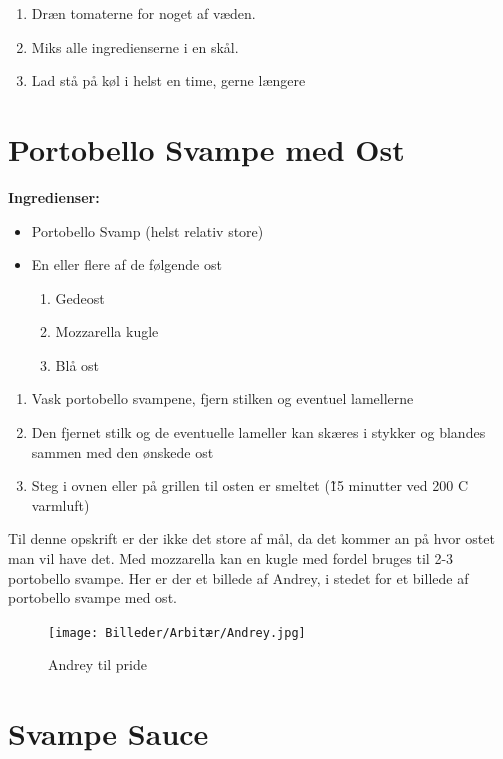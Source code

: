 \documentclass{book}
\begin{document}
\begin{minipage}[t]{0.5\textwidth}
\begin{enumerate}
    \item Dræn tomaterne for noget af væden.
    \item Miks alle ingredienserne i en skål.
    \item Lad stå på køl i helst en time, gerne længere
\end{enumerate}
\end{minipage}
\newpage 
{}
\newpage\section{Portobello Svampe med Ost}
\begin{minipage}[t]{0.5\textwidth}
\textbf{Ingredienser:}
\begin{itemize}
    \item Portobello Svamp (helst relativ store)
    \item En eller flere af de følgende ost
    \begin{enumerate}
        \item Gedeost
        \item Mozzarella kugle
        \item Blå ost
    \end{enumerate}
\end{itemize}
\end{minipage}
\begin{minipage}[t]{0.5\textwidth}
\begin{enumerate}
    \item Vask portobello svampene, fjern stilken og eventuel lamellerne
    \item Den fjernet stilk og de eventuelle lameller kan skæres i stykker og blandes sammen med den ønskede ost
    \item Steg i ovnen eller på grillen til osten er smeltet (\~15 minutter ved 200 \degree C varmluft)
\end{enumerate}
\end{minipage}
Til denne opskrift er der ikke det store af mål, da det kommer an på hvor ostet man vil have det. Med mozzarella kan en kugle med fordel bruges til 2-3 portobello svampe.
\newpage Her er der et billede af Andrey, i stedet for et billede af portobello svampe med ost.
\begin{figure}
    \centering
    \texttt{[image: Billeder/Arbitær/Andrey.jpg]}
    \caption{Andrey til pride}
\end{figure}
\newpage \section{Svampe Sauce}
\end{document}
